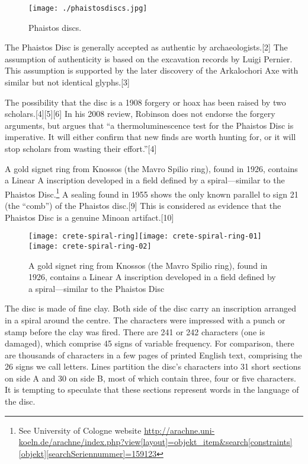 \begin{figure}[htp]
\centering

\texttt{[image: ./phaistosdiscs.jpg]}
\caption{Phaistos discs.}
\end{figure}

The Phaistos Disc is generally accepted as authentic by archaeologists.[2] The assumption of authenticity is based on the excavation records by Luigi Pernier. This assumption is supported by the later discovery of the Arkalochori Axe with similar but not identical glyphs.[3]


The possibility that the disc is a 1908 forgery or hoax has been raised by two scholars.[4][5][6] In his 2008 review, Robinson does not endorse the forgery arguments, but argues that \enquote{a thermoluminescence test for the Phaistos Disc is imperative. It will either confirm that new finds are worth hunting for, or it will stop scholars from wasting their effort.}[4]

A gold signet ring from Knossos (the Mavro Spilio ring), found in 1926, contains a Linear A inscription developed in a field defined by a spiral—similar to the Phaistos Disc.\footnote{See University of Cologne website \url{http://arachne.uni-koeln.de/arachne/index.php?view[layout]=objekt_item\&search[constraints][objekt][searchSeriennummer]=159123}} A sealing found in 1955 shows the only known parallel to sign 21 (the \enquote{comb}) of the Phaistos disc.[9] This is considered as evidence that the Phaistos Disc is a genuine Minoan artifact.[10]

\begin{figure}[htbp]
\centering

\texttt{[image: crete-spiral-ring]}\texttt{[image: crete-spiral-ring-01]}\texttt{[image: crete-spiral-ring-02]}

\caption{A gold signet ring from Knossos (the Mavro Spilio ring), found in 1926, contains a Linear A inscription developed in a field defined by a spiral—similar to the Phaistos Disc}
\end{figure}

The disc is made of fine clay.  Both side of the disc carry an inscription arranged in a spiral around the centre. The characters were impressed with a punch or stamp before the clay was fired. There are
241 or 242 characters (one is damaged), which
comprise 45 signs of variable frequency. For
comparison, there are thousands of characters in a few pages of printed English text, comprising the 26 signs we call letters. Lines partition
the disc’s characters into 31 short sections on
side A and 30 on side B, most of which contain
three, four or five characters. It is tempting to
speculate that these sections represent words
in the language of the disc.

